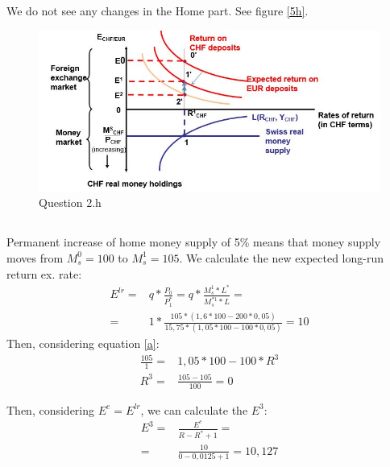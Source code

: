 \documentclass[	11pt, ]{fphw}
\begin{document}
\subsection{}
We do not see any changes in the Home part. See figure \vref{5h}.
\begin{figure}[h!] 
\centering 
\includegraphics[scale=0.7]{5h.JPG} 
\caption{Question 2.h} 
\label{5h}
\end{figure}

\subsection{}
Permanent increase of home money supply of 5\% means that money supply moves from $M^{0}_{s}=100$ to $M^{1}_{s}=105$. 
We calculate the new expected long-run return ex. rate:
\begin{align}
    E^{lr}=&q*\frac{P_{0}}{P^{*}_{1}}=q*\frac{M^{1}_{s}* L^{*}}{M^{*1}_{s}*L} = \\
    =&1*\frac{105*(1,6*100-200*0,05)}{15,75*(1,05*100-100*0,05)}=10
\end{align}
Then, considering equation \ref{a}:
\begin{align}
\frac{105}{1}=&1,05*100-100*R^{3}\\
R^{3}=&\frac{105-105}{100}=0
\end{align}

Then, considering $E^{e}=E^{lr}$, we can calculate the $E^{3}$:
\begin{align}
    E^{3}=&\frac{E^{e}}{R-R^{*}+1}= \\
   =&\frac{10}{0-0,0125+1}=10,127
\end{align}
\end{document}
